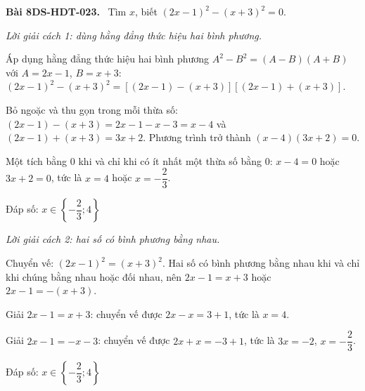 \documentclass[12pt,a4paper]{article}
\newenvironment{problem}[1][]{\par\medskip\noindent\textbf{Bài #1.}\ }{\par}
\newenvironment{solution}[1][]{\par\noindent\textit{Lời giải #1.}\par}{\par}
\begin{document}
\begin{problem}[8DS-HDT-023]
Tìm $x$, biết $(2x - 1)^2 - (x + 3)^2 = 0$.

\begin{solution}[cách 1: dùng hằng đẳng thức hiệu hai bình phương]
Áp dụng hằng đẳng thức hiệu hai bình phương $A^2 - B^2 = (A - B)(A + B)$ với $A = 2x - 1$, $B = x + 3$: $(2x - 1)^2 - (x + 3)^2 = \left[(2x - 1) - (x + 3)\right]\left[(2x - 1) + (x + 3)\right]$.

Bỏ ngoặc và thu gọn trong mỗi thừa số: $(2x - 1) - (x + 3) = 2x - 1 - x - 3 = x - 4$ và $(2x - 1) + (x + 3) = 3x + 2$. Phương trình trở thành $(x - 4)(3x + 2) = 0$.

Một tích bằng $0$ khi và chỉ khi có ít nhất một thừa số bằng $0$: $x - 4 = 0$ hoặc $3x + 2 = 0$, tức là $x = 4$ hoặc $x = -\dfrac{2}{3}$.

Đáp số: $\boxed{x \in \left\{-\dfrac{2}{3}; 4\right\}}$
\end{solution}

\begin{solution}[cách 2: hai số có bình phương bằng nhau]
Chuyển vế: $(2x - 1)^2 = (x + 3)^2$. Hai số có bình phương bằng nhau khi và chỉ khi chúng bằng nhau hoặc đối nhau, nên $2x - 1 = x + 3$ hoặc $2x - 1 = -(x + 3)$.

Giải $2x - 1 = x + 3$: chuyển vế được $2x - x = 3 + 1$, tức là $x = 4$.

Giải $2x - 1 = -x - 3$: chuyển vế được $2x + x = -3 + 1$, tức là $3x = -2$, $x = -\dfrac{2}{3}$.

Đáp số: $\boxed{x \in \left\{-\dfrac{2}{3}; 4\right\}}$
\end{solution}
\end{problem}
\end{document}
